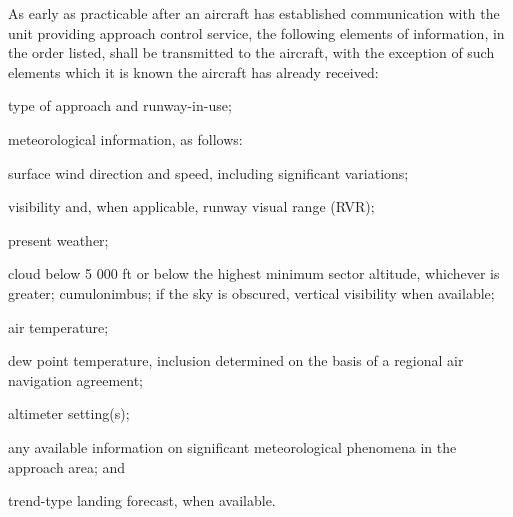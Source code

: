\begin{enumempty}[labelindent=\parindent]
    \item {}
\end{enumempty}

\begin{enumnoss}
    \item As early as practicable after an aircraft has established communication with the unit providing approach control service, the following elements of information, in the order listed, shall be transmitted to the aircraft, with the exception of such elements which it is known the aircraft has already received:

    \begin{enumalph}
        \item type of approach and runway-in-use;
        \item meteorological information, as follows:

        \begin{enumarab}
            \item surface wind direction and speed, including significant variations;
            \item visibility and, when applicable, runway visual range (RVR);
            \item present weather;
            \item cloud below 5 000 ft or below the highest minimum sector altitude, whichever is greater; cumulonimbus; if the sky is obscured, vertical visibility when available;
            \item air temperature;
            \item dew point temperature, inclusion determined on the basis of a regional air navigation agreement;
            \item altimeter setting(s);
            \item any available information on significant meteorological phenomena in the approach area; and
            \item trend-type landing forecast, when available.
        \end{enumarab}
    \end{enumalph}



\end{enumnoss}
